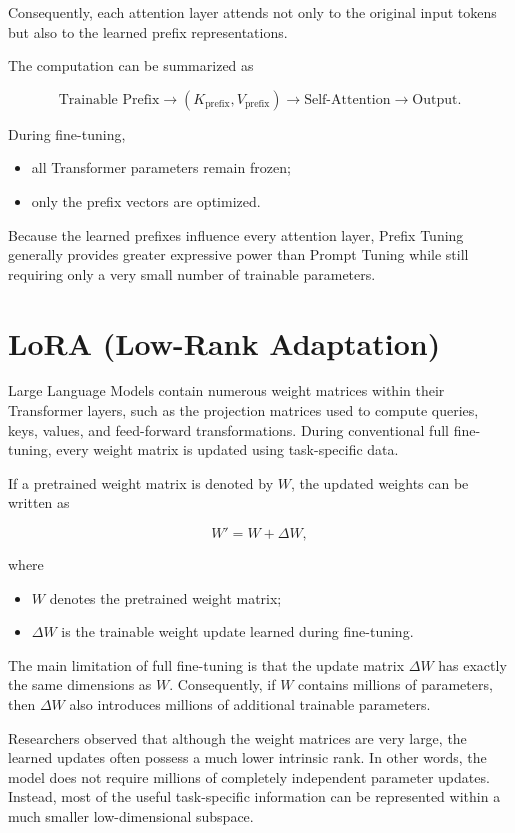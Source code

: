 Consequently, each attention layer attends not only to the original input tokens but also to the learned prefix representations.

The computation can be summarized as

\[
\text{Trainable Prefix}
\longrightarrow
(K_{\text{prefix}},V_{\text{prefix}})
\longrightarrow
\text{Self-Attention}
\longrightarrow
\text{Output}.
\]

During fine-tuning,

\begin{itemize}
\item all Transformer parameters remain frozen;
\item only the prefix vectors are optimized.
\end{itemize}

Because the learned prefixes influence every attention layer, Prefix Tuning generally provides greater expressive power than Prompt Tuning while still requiring only a very small number of trainable parameters.


\section{LoRA (Low-Rank Adaptation)}

Large Language Models contain numerous weight matrices within their Transformer layers, such as the projection matrices used to compute queries, keys, values, and feed-forward transformations. During conventional full fine-tuning, every weight matrix is updated using task-specific data.

If a pretrained weight matrix is denoted by \(W\), the updated weights can be written as

\[
W' = W + \Delta W,
\]

where

\begin{itemize}
    \item \(W\) denotes the pretrained weight matrix;
    \item \(\Delta W\) is the trainable weight update learned during fine-tuning.
\end{itemize}

The main limitation of full fine-tuning is that the update matrix \(\Delta W\) has exactly the same dimensions as \(W\). Consequently, if \(W\) contains millions of parameters, then \(\Delta W\) also introduces millions of additional trainable parameters.

Researchers observed that although the weight matrices are very large, the learned updates often possess a much lower intrinsic rank. In other words, the model does not require millions of completely independent parameter updates. Instead, most of the useful task-specific information can be represented within a much smaller low-dimensional subspace.

